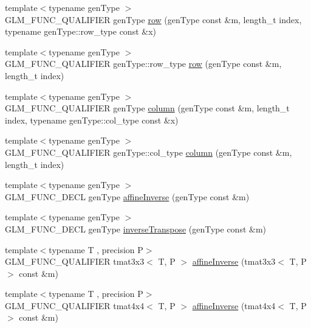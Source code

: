 \begin{DoxyCompactItemize}
\item 
{\footnotesize template$<$typename gen\+Type $>$ }\\G\+L\+M\+\_\+\+F\+U\+N\+C\+\_\+\+Q\+U\+A\+L\+I\+F\+I\+E\+R gen\+Type \hyperlink{group__gtc__matrix__access_gaadcc64829aadf4103477679e48c7594f}{row} (gen\+Type const \&m, length\+\_\+t index, typename gen\+Type\+::row\+\_\+type const \&x)
\item 
{\footnotesize template$<$typename gen\+Type $>$ }\\G\+L\+M\+\_\+\+F\+U\+N\+C\+\_\+\+Q\+U\+A\+L\+I\+F\+I\+E\+R gen\+Type\+::row\+\_\+type \hyperlink{group__gtc__matrix__access_ga259e5ebd0f31ec3f83440f8cae7f5dba}{row} (gen\+Type const \&m, length\+\_\+t index)
\item 
{\footnotesize template$<$typename gen\+Type $>$ }\\G\+L\+M\+\_\+\+F\+U\+N\+C\+\_\+\+Q\+U\+A\+L\+I\+F\+I\+E\+R gen\+Type \hyperlink{group__gtc__matrix__access_ga9e757377523890e8b80c5843dbe4dd15}{column} (gen\+Type const \&m, length\+\_\+t index, typename gen\+Type\+::col\+\_\+type const \&x)
\item 
{\footnotesize template$<$typename gen\+Type $>$ }\\G\+L\+M\+\_\+\+F\+U\+N\+C\+\_\+\+Q\+U\+A\+L\+I\+F\+I\+E\+R gen\+Type\+::col\+\_\+type \hyperlink{group__gtc__matrix__access_ga96022eb0d3fae39d89fc7a954e59b374}{column} (gen\+Type const \&m, length\+\_\+t index)
\item 
{\footnotesize template$<$typename gen\+Type $>$ }\\G\+L\+M\+\_\+\+F\+U\+N\+C\+\_\+\+D\+E\+C\+L gen\+Type \hyperlink{group__gtc__matrix__inverse_gae0fcc5fc8783291f9702272de428fa0e}{affine\+Inverse} (gen\+Type const \&m)
\item 
{\footnotesize template$<$typename gen\+Type $>$ }\\G\+L\+M\+\_\+\+F\+U\+N\+C\+\_\+\+D\+E\+C\+L gen\+Type \hyperlink{group__gtc__matrix__inverse_gab213cd0e3ead5f316d583f99d6312008}{inverse\+Transpose} (gen\+Type const \&m)
\item 
{\footnotesize template$<$typename T , precision P$>$ }\\G\+L\+M\+\_\+\+F\+U\+N\+C\+\_\+\+Q\+U\+A\+L\+I\+F\+I\+E\+R tmat3x3$<$ T, P $>$ \hyperlink{namespaceglm_ae7dd7d782251f5939d55b8f8d8097d3f}{affine\+Inverse} (tmat3x3$<$ T, P $>$ const \&m)
\item 
{\footnotesize template$<$typename T , precision P$>$ }\\G\+L\+M\+\_\+\+F\+U\+N\+C\+\_\+\+Q\+U\+A\+L\+I\+F\+I\+E\+R tmat4x4$<$ T, P $>$ \hyperlink{namespaceglm_aae96d3c56681fe2da653a612320b5c51}{affine\+Inverse} (tmat4x4$<$ T, P $>$ const \&m)

\end{DoxyCompactItemize}
